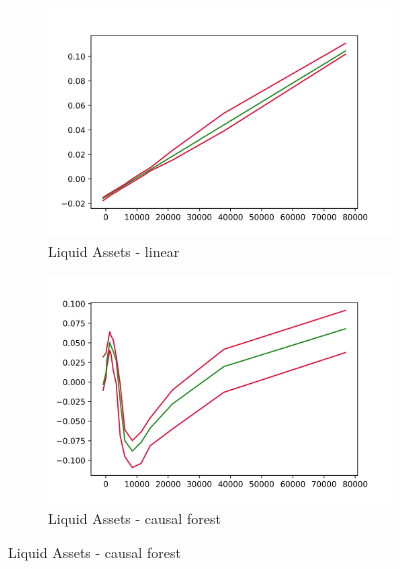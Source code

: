 \begin{figure}[h]
    \centering
    \begin{subfigure}{0.5\linewidth}
        \includegraphics[width=\linewidth]{figures/ALE/chFDexp/spec3_linear_liqassii.png}
        \caption{Liquid Assets - linear}
    \end{subfigure}%
    \begin{subfigure}{0.5\linewidth}
        \includegraphics[width=\linewidth]{figures/ALE/chFDexp/spec3_cf_liqassii.png}
        \caption{Liquid Assets - causal forest}
    \end{subfigure}


\end{figure}
